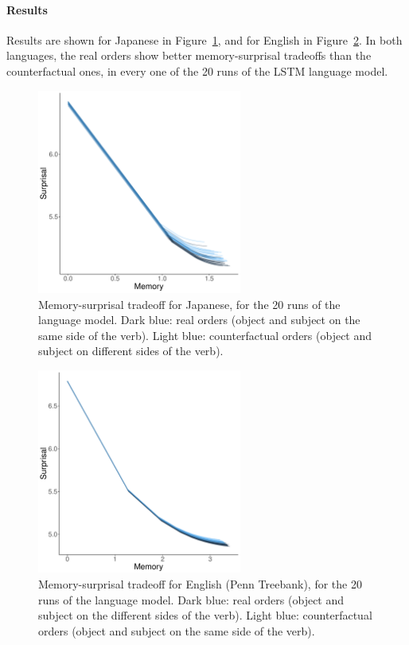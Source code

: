 \documentclass[11pt,a4paper]{article}
\begin{document}
\paragraph{Results}

Results are shown for Japanese in Figure~\ref{fig:memsurp-jap}, and for English in Figure~\ref{fig:memsurp-ptb}.
In both languages, the real orders show better memory-surprisal tradeoffs than the counterfactual ones, in every one of the 20 runs of the LSTM language model.




\begin{figure}
    \centering
    \includegraphics[width=0.6\textwidth]{figures/japanese-memsurp.pdf}
\caption{Memory-surprisal tradeoff for Japanese, for the 20 runs of the language model. Dark blue: real orders (object and subject on the same side of the verb). Light blue: counterfactual orders (object and subject on different sides of the verb).}\label{fig:memsurp-jap}
\end{figure}


\begin{figure}
    \centering
    \includegraphics[width=0.6\textwidth]{figures/ptb-memsurp.pdf}
\caption{Memory-surprisal tradeoff for English (Penn Treebank), for the 20 runs of the language model. Dark blue: real orders (object and subject on the different sides of the verb). Light blue: counterfactual orders (object and subject on the same side of the verb).}\label{fig:memsurp-ptb}
\end{figure}
\end{document}
